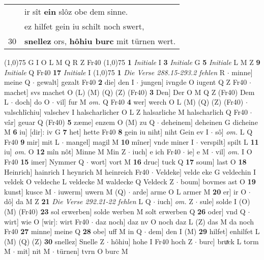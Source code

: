 \documentclass[8pt,a4paper,notitlepage]{article}
\begin{document}
\begin{table}[ht]
\begin{minipage}[t]{0.5\linewidth}
\begin{tabular}{rl}
 & ir sît \textbf{ein} slôz obe dem sinne.\\ 
 & ez hilfet gein iu schilt noch swert,\\ 
30 & \textbf{snellez} ors, \textbf{hôhiu burc} mit türnen wert.\\ 
\end{tabular}
\scriptsize
\line(1,0){75} \newline
G I O L M Q R Z Fr40 \newline
\line(1,0){75} \newline
\textbf{1} \textit{Initiale} I  \textbf{3} \textit{Initiale} G  \textbf{5} \textit{Initiale} L M Z  \textbf{9} \textit{Initiale} Q Fr40  \textbf{17} \textit{Initiale} I  \newline
\line(1,0){75} \newline
\textbf{1} \textit{Die Verse 288.15-293.2 fehlen} R   $\cdot$ minne] meine Q  $\cdot$ gewalt] gezalt Fr40 \textbf{2} die] den I  $\cdot$ jungen] ivngde O iugent Q Z Fr40  $\cdot$ machet] svs machet O (L) (M) (Q) (Z) (Fr40) \textbf{3} Den] Der O M Q Z (Fr40) Dem L  $\cdot$ doch] do O  $\cdot$ vil] fur M \textit{om.} Q Fr40 \textbf{4} wer] werch O L (M) (Q) (Z) (Fr40)  $\cdot$ valschlîchiu] valschev I halscharlicher O L Z halsarliche M halscharlich Q Fr40  $\cdot$ vâr] geuar Q (Fr40) \textbf{5} zæme] enzem O (M) zu Q  $\cdot$ deheinem] deheinen G dicheine M \textbf{6} iu] [dir]: iv G \textbf{7} het] hette Fr40 \textbf{8} gein iu niht] niht Gein ev I  $\cdot$ sô] \textit{om.} L Q Fr40 \textbf{9} mir] mit L  $\cdot$ mangel] magil M \textbf{10} mîner] vnde miner I  $\cdot$ verspilt] spilt L \textbf{11} iu] \textit{om.} O \textbf{12} mîn nôt] Minne M Min Z  $\cdot$ iuch] e ich Fr40  $\cdot$ ie] e M  $\cdot$ vil] \textit{om.} I O Fr40 \textbf{15} imer] Nymmer Q  $\cdot$ wort] vort M \textbf{16} druc] tuck Q \textbf{17} soum] last O \textbf{18} Heinrich] hainrich I heynrich M heinreich Fr40  $\cdot$ Veldeke] velde eke G veldechin I veldek O veldeche L veldecke M waldecke Q Veldeck Z  $\cdot$ boum] bovmes ast O \textbf{19} kunst] kusce M  $\cdot$ iuwerm] uwern M (Q)  $\cdot$ arde] arme O L armer M \textbf{20} er] ir O  $\cdot$ dô] da M Z \textbf{21} \textit{Die Verse 292.21-22 fehlen} L Q   $\cdot$ iuch] \textit{om.} Z  $\cdot$ sule] solde I (O) (M) (Fr40) \textbf{23} sol erwerben] solde werben M solt erwerben Q \textbf{26} oder] vnd Q  $\cdot$ wirt] wie O [wir]: wirt Fr40  $\cdot$ daz noch] daz nv O noch daz L (Z) das M da noch Fr40 \textbf{27} minne] meine Q \textbf{28} obe] uff M in Q  $\cdot$ dem] den I (M) \textbf{29} hilfet] enhilfet L (M) (Q) (Z) \textbf{30} snellez] Snelle Z  $\cdot$ hôhiu] hohe I Fr40 hoch Z  $\cdot$ burc] bruͯck L torm M  $\cdot$ mit] nit M  $\cdot$ türnen] tvrn O burc M \newline

\end{minipage}
\end{table}
\end{document}
